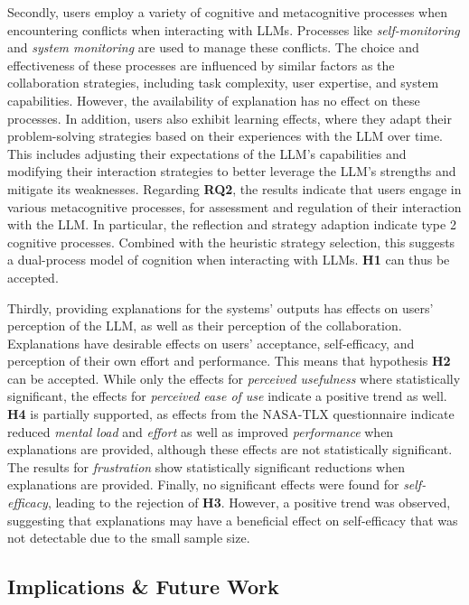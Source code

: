 Secondly, users employ a variety of cognitive and metacognitive processes when encountering conflicts when interacting with \acp{LLM}. Processes like \textit{self-monitoring} and \textit{system monitoring} are used to manage these conflicts. The choice and effectiveness of these processes are influenced by similar factors as the collaboration strategies, including task complexity, user expertise, and system capabilities. However, the availability of explanation has no effect on these processes. In addition, users also exhibit learning effects, where they adapt their problem-solving strategies based on their experiences with the \ac{LLM} over time. This includes adjusting their expectations of the \ac{LLM}'s capabilities and modifying their interaction strategies to better leverage the \ac{LLM}'s strengths and mitigate its weaknesses. Regarding \textbf{RQ2}, the results indicate that users engage in various metacognitive processes, for assessment and regulation of their interaction with the \ac{LLM}. In particular, the reflection and strategy adaption indicate type 2 cognitive processes. Combined with the heuristic strategy selection, this suggests a dual-process model of cognition when interacting with \acp{LLM}. \textbf{H1} can thus be accepted.

Thirdly, providing explanations for the systems' outputs has effects on users' perception of the \ac{LLM}, as well as their perception of the collaboration. Explanations have desirable effects on users' acceptance, self-efficacy, and perception of their own effort and performance. This means that hypothesis \textbf{H2} can be accepted. While only the effects for \textit{perceived usefulness} where statistically significant, the effects for \textit{perceived ease of use} indicate a positive trend as well. \textbf{H4} is partially supported, as effects from the \acs{NASA}-\ac{TLX} questionnaire indicate reduced \textit{mental load} and \textit{effort} as well as improved \textit{performance} when explanations are provided, although these effects are not statistically significant. The results for \textit{frustration} show statistically significant reductions when explanations are provided. Finally, no significant effects were found for \textit{self-efficacy}, leading to the rejection of \textbf{H3}. However, a positive trend was observed, suggesting that explanations may have a beneficial effect on self-efficacy that was not detectable due to the small sample size.

\subsection{Implications \& Future Work} \label{ssec:implications}


